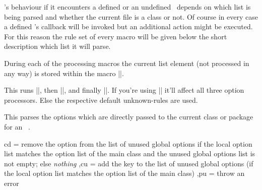 \expkvo's behaviour if it encounters a defined or an undefined \key\ depends on
which list is being parsed and whether the current file is a class or not. Of
course in every case a defined \key's callback will be invoked  but an
additional action might be executed. For this reason the rule set of every macro
will be given below the short description which list it will parse.

During each of the processing macros the current list element (not processed in
any way) is stored within the macro |\CurrentOption|.

\begin{function}{\ekvoProcessOptions}
  \begin{syntax}
  \end{syntax}
  This runs |\ekvoProcessGlobalOptions|, then |\ekvoProcessLocalOptions|, and
  finally |\ekvoProcessFutureOptions|. If you're using |\ekvoUseUnknownHandlers|
  it'll affect all three option processors. Else the respective default
  unknown-rules are used.
\end{function}

\begin{function}{\ekvoProcessLocalOptions}
  \begin{syntax}
  \end{syntax}
  This parses the options which are directly passed to the current class or
  package for an \expkv\ \set.
\end{function}
\expkvorules
  {%
     cd = {remove the option from the list of unused global options if the local
       option list matches the option list of the main class and the unused
       global options list is not empty; else \emph{nothing}}
    ,cu = add the key to the list of unused global options (if the local option
      list matches the option list of the main class)
    ,pu = throw an error
  }



